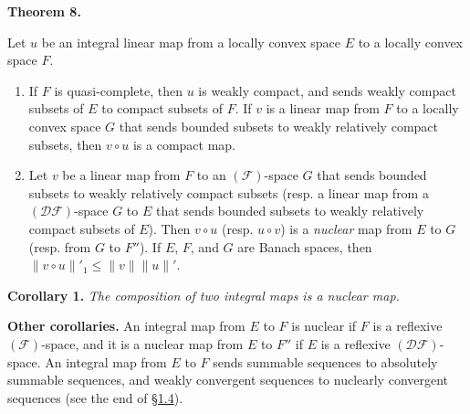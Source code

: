 \documentclass[british]{article}
\newenvironment{itenv}[1]
  {\phantomsection\par\smallskip\noindent\textbf{#1.}\itshape}
  {\par\smallskip}
\newenvironment{rmenv}[1]
  {\phantomsection\par\smallskip\noindent\textbf{#1.}\rmfamily}
  {\par\smallskip}
\newcommand{\oldpage}[1]{\marginpar{\footnotesize$\Big\vert$ \textit{p.~#1}}}
\begin{document}
\protect{}\label{section-1-theorem-8}
\begin{itenv}{Theorem 8}

Let \(u\) be an integral linear map from a locally convex space \(E\) to
a locally convex space \(F\).

\begin{enumerate}
\def\labelenumi{\arabic{enumi}.}
\item
  If \(F\) is quasi-complete, then \(u\) is weakly compact, and sends
  weakly compact subsets of \(E\) to compact subsets of \(F\). If \(v\)
  is a linear map from \(F\) to a locally convex space \(G\) that sends
  bounded subsets to weakly relatively compact subsets, then
  \(v\circ u\) is a compact map.
\item
  Let \(v\) be a linear map from \(F\) to an \((\mathscr{F})\)-space
  \(G\) that sends bounded subsets to weakly relatively compact subsets
  (resp. a linear map from a \((\mathscr{DF})\)-space \(G\) to \(E\)
  that sends bounded subsets to weakly relatively compact subsets of
  \(E\)). Then \(v\circ u\) (resp. \(u\circ v\)) is a \emph{nuclear} map
  from \(E\) to \(G\) (resp. from \(G\) to \(F''\)). If \(E\), \(F\),
  and \(G\) are Banach spaces, then
  \(\|v\circ u\|'_1\leqslant\|v\|\|u\|'\).
\end{enumerate}

\end{itenv}

\protect{}\label{section-1-corollary-1}
\begin{itenv}{Corollary 1}
The composition of two integral maps is a nuclear map.

\end{itenv}

\begin{rmenv}{Other corollaries}
An integral map from \(E\) to \(F\) is nuclear if \(F\) is a reflexive
\((\mathscr{F})\)-space, and it is a nuclear map from \(E\) to \(F''\)
if \(E\) is a reflexive \((\mathscr{DF})\)-space. \oldpage{90} An
integral map from \(E\) to \(F\) sends summable sequences to absolutely
summable sequences, and weakly convergent sequences to nuclearly
convergent sequences (see the end of \hyperref[section-1.4]{§1.4}).

\end{rmenv}
\end{document}
